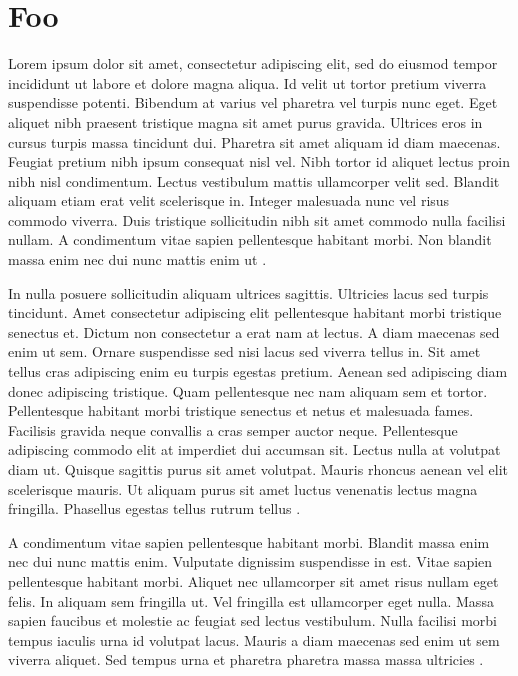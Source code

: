 \documentclass{article}
\begin{document}
\section{Foo}
\label{foo}
Lorem ipsum dolor sit amet, consectetur adipiscing elit, sed do eiusmod tempor
incididunt ut labore et dolore magna aliqua. Id velit ut tortor pretium viverra
suspendisse potenti. Bibendum at varius vel pharetra vel turpis nunc eget. Eget
aliquet nibh praesent tristique magna sit amet purus gravida. Ultrices eros in
cursus turpis massa tincidunt dui. Pharetra sit amet aliquam id diam maecenas.
Feugiat pretium nibh ipsum consequat nisl vel. Nibh tortor id aliquet lectus
proin nibh nisl condimentum. Lectus vestibulum mattis ullamcorper velit sed.
Blandit aliquam etiam erat velit scelerisque in. Integer malesuada nunc vel
risus commodo viverra. Duis tristique sollicitudin nibh sit amet commodo nulla
facilisi nullam. A condimentum vitae sapien pellentesque habitant morbi. Non
blandit massa enim nec dui nunc mattis enim ut \cite{mahajan2010efficient}.
\par
In nulla posuere sollicitudin aliquam ultrices sagittis. Ultricies lacus sed
turpis tincidunt. Amet consectetur adipiscing elit pellentesque habitant morbi
tristique senectus et. Dictum non consectetur a erat nam at lectus. A diam
maecenas sed enim ut sem. Ornare suspendisse sed nisi lacus sed viverra tellus
in. Sit amet tellus cras adipiscing enim eu turpis egestas pretium. Aenean sed
adipiscing diam donec adipiscing tristique. Quam pellentesque nec nam aliquam
sem et tortor. Pellentesque habitant morbi tristique senectus et netus et
malesuada fames. Facilisis gravida neque convallis a cras semper auctor neque.
Pellentesque adipiscing commodo elit at imperdiet dui accumsan sit. Lectus
nulla at volutpat diam ut. Quisque sagittis purus sit amet volutpat. Mauris
rhoncus aenean vel elit scelerisque mauris. Ut aliquam purus sit amet luctus
venenatis lectus magna fringilla. Phasellus egestas tellus rutrum tellus
\cite{zhou_da_fir_fpga}.
\par
A condimentum vitae sapien pellentesque habitant morbi. Blandit massa enim nec
dui nunc mattis enim. Vulputate dignissim suspendisse in est. Vitae sapien
pellentesque habitant morbi. Aliquet nec ullamcorper sit amet risus nullam eget
felis. In aliquam sem fringilla ut. Vel fringilla est ullamcorper eget nulla.
Massa sapien faucibus et molestie ac feugiat sed lectus vestibulum. Nulla
facilisi morbi tempus iaculis urna id volutpat lacus. Mauris a diam maecenas
sed enim ut sem viverra aliquet. Sed tempus urna et pharetra pharetra massa
massa ultricies \cite{avi_dist_dwt_fpga_2015}.
\end{document}

